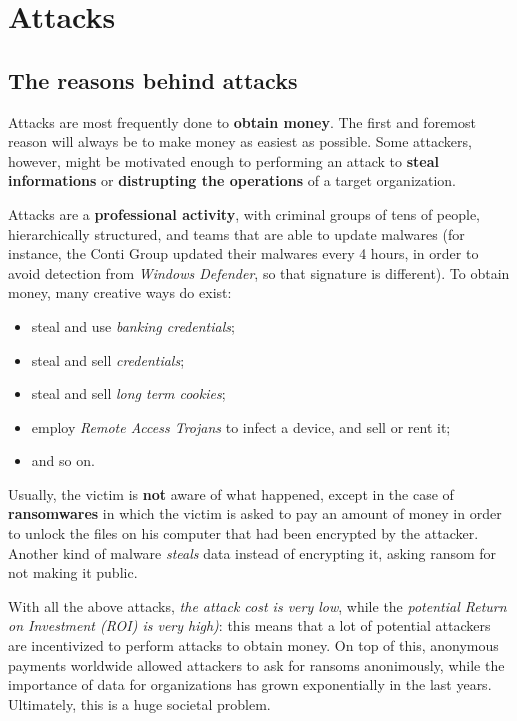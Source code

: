 \documentclass[10pt]{extbook}
\begin{document}
\chapter{Attacks}

\section{The reasons behind attacks}

Attacks are most frequently done to \textbf{obtain money}. The first and
foremost reason will always be to make money as easiest as possible. Some
attackers, however, might be motivated enough to performing an attack to
\textbf{steal informations} or \textbf{distrupting the operations} of a
target organization.

Attacks are a \textbf{professional activity}, with criminal groups of tens of
people, hierarchically structured, and teams that are able to update malwares
(for instance, the Conti Group updated their malwares every 4 hours, in order
to avoid detection from \emph{Windows Defender}, so that signature is
different). To obtain money, many creative ways do exist:
\begin{itemize}
    \item steal and use \emph{banking credentials};
    \item steal and sell \emph{credentials};
    \item steal and sell \emph{long term cookies};
    \item employ \emph{Remote Access Trojans} to infect a device, and sell or
        rent it;
    \item and so on.
\end{itemize}

Usually, the victim is \textbf{not} aware of what happened, except in the case
of \textbf{ransomwares} in which the victim is asked to pay an amount of money
in order to unlock the files on his computer that had been encrypted by the
attacker. Another kind of malware \emph{steals} data instead of encrypting it,
asking ransom for not making it public.

With all the above attacks, \emph{the attack cost is very low}, while the
\emph{potential Return on Investment (ROI) is very high)}: this means that a
lot of potential attackers are incentivized to perform attacks to obtain money.
On top of this, anonymous payments worldwide allowed attackers to ask for
ransoms anonimously, while the importance of data for organizations has grown
exponentially in the last years. Ultimately, this is a huge societal problem.
\end{document}
